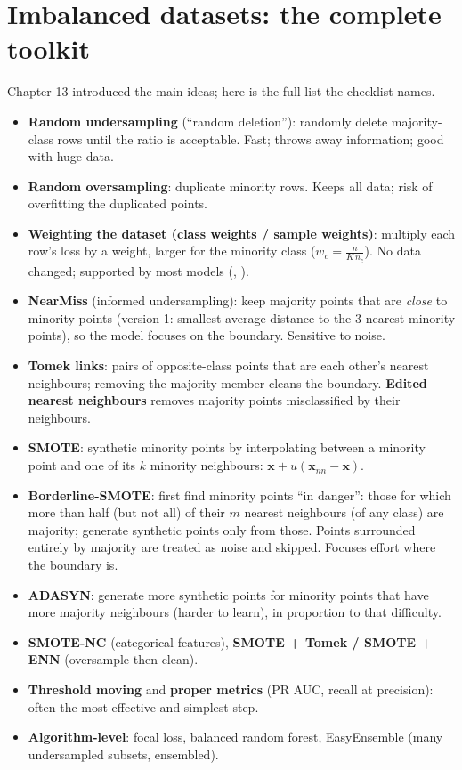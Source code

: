 \section{Imbalanced datasets: the complete toolkit}
Chapter 13 introduced the main ideas; here is the full list the checklist names.
\begin{itemize}
\item \textbf{Random undersampling} (``random deletion''): randomly delete majority-class rows until the ratio is acceptable. Fast; throws away information; good with
  huge data.
\item \textbf{Random oversampling}: duplicate minority rows. Keeps all data; risk of overfitting the duplicated points.
\item \textbf{Weighting the dataset (class weights / sample weights)}: multiply each row's loss by a weight, larger for the minority class
  ($w_c = \frac{n}{K\,n_c}$). No data changed; supported by most models (, ).
\item \textbf{NearMiss} (informed undersampling): keep majority points that are \emph{close} to minority points (version 1: smallest average distance to the 3 nearest minority
  points), so the model focuses on the boundary. Sensitive to noise.
\item \textbf{Tomek links}: pairs of opposite-class points that are each other's nearest neighbours; removing the majority member cleans the boundary. \textbf{Edited nearest
  neighbours} removes majority points misclassified by their neighbours.
\item \textbf{SMOTE}: synthetic minority points by interpolating between a minority point and one of its $k$ minority neighbours: $\mathbf x + u(\mathbf x_{nn} - \mathbf x)$.
\item \textbf{Borderline-SMOTE}: first find minority points ``in danger'': those for which more than half (but not all) of their $m$ nearest neighbours (of any class) are
  majority; generate synthetic points only from those. Points surrounded entirely by majority are treated as noise and skipped. Focuses effort where the boundary is.
\item \textbf{ADASYN}: generate more synthetic points for minority points that have more majority neighbours (harder to learn), in proportion to that difficulty.
\item \textbf{SMOTE-NC} (categorical features), \textbf{SMOTE + Tomek / SMOTE + ENN} (oversample then clean).
\item \textbf{Threshold moving} and \textbf{proper metrics} (PR AUC, recall at precision): often the most effective and simplest step.
\item \textbf{Algorithm-level}: focal loss, balanced random forest, EasyEnsemble (many undersampled subsets, ensembled).
\end{itemize}
